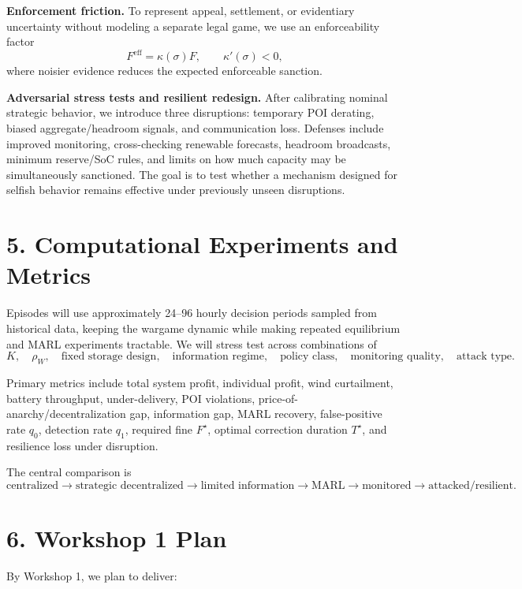 \documentclass[10pt]{article}
\begin{document}
\textbf{Enforcement friction.}
To represent appeal, settlement, or evidentiary uncertainty without modeling a separate legal game, we use an enforceability factor
\[
F^{\mathrm{eff}}=\kappa(\sigma)F,
\qquad
\kappa'(\sigma)<0,
\]
where noisier evidence reduces the expected enforceable sanction.

\textbf{Adversarial stress tests and resilient redesign.}
After calibrating nominal strategic behavior, we introduce three disruptions: temporary POI derating, biased aggregate/headroom signals, and communication loss. Defenses include improved monitoring, cross-checking renewable forecasts, headroom broadcasts, minimum reserve/SoC rules, and limits on how much capacity may be simultaneously sanctioned. The goal is to test whether a mechanism designed for selfish behavior remains effective under previously unseen disruptions.

\section*{5. Computational Experiments and Metrics}

Episodes will use approximately 24--96 hourly decision periods sampled from historical data, keeping the wargame dynamic while making repeated equilibrium and MARL experiments tractable. We will stress test across combinations of
\[
K,\quad
\rho_W,\quad
\text{fixed storage design},\quad
\text{information regime},\quad
\text{policy class},\quad
\text{monitoring quality},\quad
\text{attack type}.
\]

Primary metrics include total system profit, individual profit, wind curtailment, battery throughput, under-delivery, POI violations, price-of-anarchy/decentralization gap, information gap, MARL recovery, false-positive rate $q_0$, detection rate $q_1$, required fine $F^\star$, optimal correction duration $T^\star$, and resilience loss under disruption.

The central comparison is
\[
\boxed{
\text{centralized}
\rightarrow
\text{strategic decentralized}
\rightarrow
\text{limited information}
\rightarrow
\text{MARL}
\rightarrow
\text{monitored}
\rightarrow
\text{attacked/resilient}.
}
\]

\section*{6. Workshop 1 Plan}

By Workshop 1, we plan to deliver:
\end{document}
